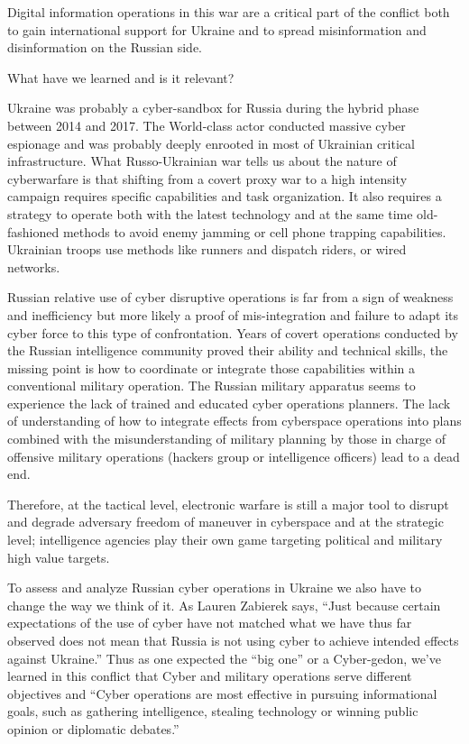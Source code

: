 Digital information operations in this war are a critical part of the conflict both to gain international support for Ukraine and to spread misinformation and disinformation on the Russian side. 

What have we learned and is it relevant?

Ukraine was probably a cyber-sandbox for Russia during the hybrid phase between 2014 and 2017. The World-class actor conducted massive cyber espionage and was probably deeply enrooted in most of Ukrainian critical infrastructure. What Russo-Ukrainian war tells us about the nature of cyberwarfare is that shifting from a covert proxy war to a high intensity campaign requires specific capabilities and task organization. It also requires a strategy to operate both with the latest technology and at the same time old-fashioned methods to avoid enemy jamming or cell phone trapping capabilities. Ukrainian troops use methods like runners and dispatch riders, or wired networks.

Russian relative use of cyber disruptive operations is far from a sign of weakness and inefficiency but more likely a proof of mis-integration and failure to adapt its cyber force to this type of confrontation. Years of covert operations conducted by the Russian intelligence community proved their ability and technical skills, the missing point is how to coordinate or integrate those capabilities within a conventional military operation. The Russian military apparatus seems to experience the lack of trained and educated cyber operations planners. The lack of understanding of how to integrate effects from cyberspace operations into plans combined with the misunderstanding of military planning by those in charge of offensive military operations (hackers group or intelligence officers) lead to a dead end.

Therefore, at the tactical level, electronic warfare is still a major tool to disrupt and degrade adversary freedom of maneuver in cyberspace and at the strategic level; intelligence agencies play their own game targeting political and military high value targets.

To assess and analyze Russian cyber operations in Ukraine we also have to change the way we think of it. As Lauren Zabierek says, “Just because certain expectations of the use of cyber have not matched what we have thus far observed does not mean that Russia is not using cyber to achieve intended effects against Ukraine.” Thus as one expected the “big one” or a Cyber-gedon, we’ve learned in this conflict that Cyber and military operations serve different objectives and “Cyber operations are most effective in pursuing informational goals, such as gathering intelligence, stealing technology or winning public opinion or diplomatic debates.”

